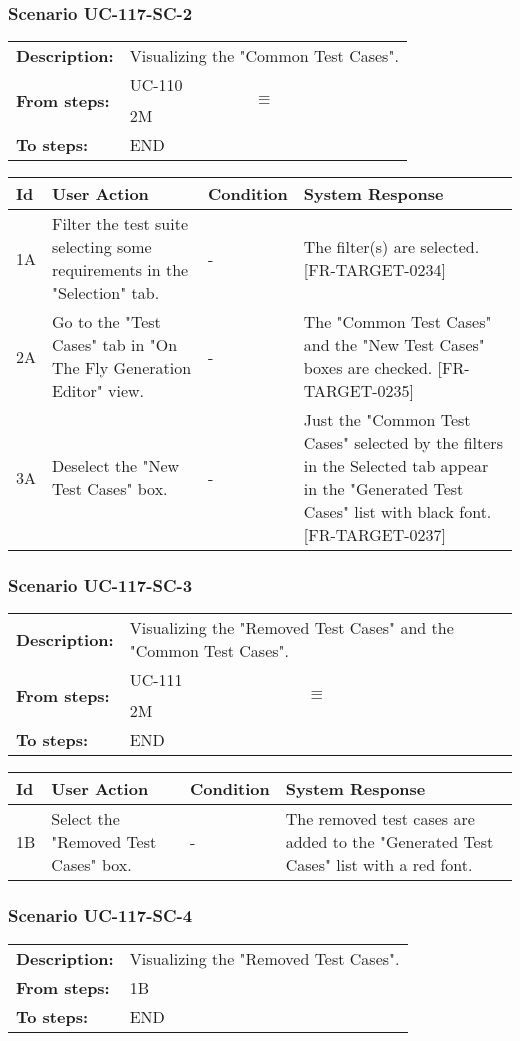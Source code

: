 \documentclass[a4paper,11pt]{article}
\newcommand{\bl}{\\ \hline}
\begin{document}
\subsubsection*{Scenario UC-117-SC-2}
\begin{tabular}{p{1in}p{4in}}
{\bf Description:} & Visualizing the "Common Test Cases". \\
{\bf From steps:} & UC-110$$\equiv$$2M \\
{\bf To steps:} & END \\
\end{tabular}
 
\begin{tabular}{|p{0.8in}|p{1.6in}|p{1.6in}|p{1.6in}|}
\hline
Id & User Action & Condition & System Response  \bl 
1A & Filter the test suite selecting some requirements in the "Selection" tab. & - & The filter(s) are selected. [FR-TARGET-0234] \bl 
2A & Go to the "Test Cases" tab in "On The Fly Generation Editor" view. & - & The "Common Test Cases" and the "New Test Cases" boxes are checked. [FR-TARGET-0235] \bl 
3A & Deselect the "New Test Cases" box. & - & Just the "Common Test Cases" selected by the filters in the Selected tab appear in the "Generated Test Cases" list with black font. [FR-TARGET-0237] \bl 
\end{tabular}
\subsubsection*{Scenario UC-117-SC-3}
\begin{tabular}{p{1in}p{4in}}
{\bf Description:} & Visualizing the "Removed Test Cases" and the "Common Test Cases". \\
{\bf From steps:} & UC-111$$\equiv$$2M \\
{\bf To steps:} & END \\
\end{tabular}
 
\begin{tabular}{|p{0.8in}|p{1.6in}|p{1.6in}|p{1.6in}|}
\hline
Id & User Action & Condition & System Response  \bl 
1B & Select the "Removed Test Cases" box. & - & The removed test cases are added to the "Generated Test Cases" list with a red font. \bl 
\end{tabular}
\subsubsection*{Scenario UC-117-SC-4}
\begin{tabular}{p{1in}p{4in}}
{\bf Description:} & Visualizing the "Removed Test Cases". \\
{\bf From steps:} & 1B \\
{\bf To steps:} & END \\
\end{tabular}
 
\end{document}
